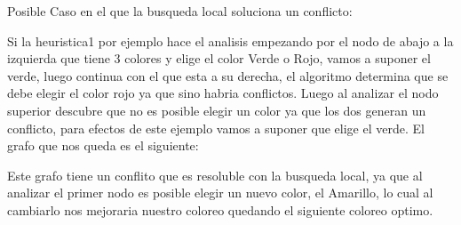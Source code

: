 Posible Caso en el que la busqueda local soluciona un conflicto:


\usetikzlibrary{positioning}


Si la heuristica1 por ejemplo hace el analisis empezando por el nodo de abajo a la izquierda que tiene 3 colores y elige el color Verde o Rojo, vamos a suponer el verde, luego continua con el que esta a su derecha, el algoritmo determina que se debe elegir el color rojo ya que sino habria conflictos. Luego al analizar el nodo superior descubre que no es posible elegir un color ya que los dos generan un conflicto, para efectos de este ejemplo vamos a suponer que elige el verde. El grafo que nos queda es el siguiente:



Este grafo tiene un conflito que es resoluble con la busqueda local, ya que al analizar el primer nodo es posible elegir un nuevo color, el Amarillo, lo cual al cambiarlo nos mejoraria nuestro coloreo quedando el siguiente coloreo optimo.

